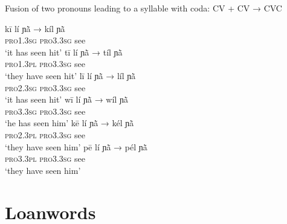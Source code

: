 \documentclass[output=paper]{langscibook}
\begin{document}
    \begin{exe}
        \ex Fusion of two pronouns leading to a syllable with coda:   CV + CV → CVC \label{ex:traore:40}
        \begin{xlist}
            \ex \gll kī              lí                  ɲã̀                →        kíl ɲã̀ \label{ex:traore:40a}\\ 
             \textsc{pro1.3sg}     \textsc{pro3.3sg}      see             {}          {}\\
             \glt `it has seen hit'
            \ex \gll tī               lí                  ɲã̀               →        tíl ɲã̀ \label{ex:traore:40b}\\ 
            \textsc{pro1.3pl}     \textsc{pro3.3sg}      see                 {}         {}\\
            \glt `they have seen hit'
            \ex \gll  lī                lí                  ɲã̀                →        líl  ɲã̀ \label{ex:traore:40c} \\
                \textsc{pro2.3sg}     \textsc{pro3.3sg}      see                {}  {}\\
                \glt `it has seen hit'
            \ex \gll wī              lí                  ɲã̀                →        wíl ɲã̀ \label{ex:traore:40d}\\
                \textsc{pro3.3sg}     \textsc{pro3.3sg}      see             {}         {}\\
                \glt `he has seen him'
            \ex \gll kē              lí                  ɲã̀                →        kél ɲã̀ \label{ex:traore:40e}\\
                \textsc{pro2.3pl}       \textsc{pro3.3sg}    see        {}      {}\\
                \glt `they have seen him'
            \ex \gll pē              lí                  ɲã̀                →        pél ɲã̀ \label{ex:traore:40f}\\
                \textsc{pro3.3pl}     \textsc{pro3.3sg}      see         {}     {}\\
                \glt `they have seen him'
        \end{xlist}
    \end{exe}

\section{Loanwords}
\label{sec:traore:loanwords:5}
\end{document}
